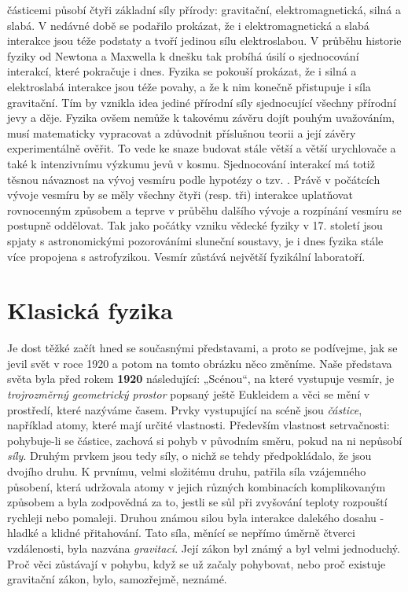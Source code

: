     částicemi působí čtyři základní síly přírody: gravitační, elektromagnetická, silná a slabá. V
    nedávné době se podařilo prokázat, že i elektromagnetická a slabá interakce jsou téže podstaty a
    tvoří jedinou sílu elektroslabou. V průběhu historie fyziky od Newtona a Maxwella k dnešku tak
    probíhá úsilí o sjednocování interakcí, které pokračuje i dnes. Fyzika se pokouší prokázat, že i
    silná a elektroslabá interakce jsou téže povahy, a že k nim konečně přistupuje i síla
    gravitační. Tím by vznikla idea jediné přírodní síly sjednocující všechny přírodní jevy a děje.
    Fyzika ovšem nemůže k takovému závěru dojít pouhým uvažováním, musí matematicky vypracovat a
    zdůvodnit příslušnou teorii a její závěry experimentálně ověřit. To vede ke snaze budovat stále
    větší a větší urychlovače a také k intenzivnímu výzkumu jevů v kosmu. Sjednocování interakcí má
    totiž těsnou návaznost na vývoj vesmíru podle hypotézy o tzv. . Právě v
    počátcích vývoje vesmíru by se měly všechny čtyři (resp. tři) interakce uplatňovat rovnocenným
    způsobem a teprve v průběhu dalšího vývoje a rozpínání vesmíru se postupně oddělovat. Tak jako
    počátky vzniku vědecké fyziky v 17. století jsou spjaty s astronomickými pozorováními sluneční
    soustavy, je i dnes fyzika stále více propojena s astrofyzikou. Vesmír zůstává největší
    fyzikální laboratoří.

  \section{Klasická fyzika}\label{fyz:IchapIIsecIII}
    Je dost těžké začít hned se současnými představami, a proto se podívejme, jak se jevil svět v
    roce 1920 a potom na tomto obrázku něco změníme. Naše představa světa byla před rokem
    \textbf{1920} následující: „Scénou“, na které vystupuje vesmír, je \emph{trojrozměrný
    geometrický prostor} popsaný ještě Eukleidem a věci se mění v prostředí, které nazýváme časem.
    Prvky vystupující na scéně jsou \emph{částice}, například atomy, které mají určité vlastnosti.
    Především vlastnost setrvačnosti: pohybuje-li se částice, zachová si pohyb v původním směru,
    pokud na ni nepůsobí \emph{síly}. Druhým prvkem jsou tedy síly, o nichž se tehdy  
    předpokládalo, že jsou dvojího druhu. K prvnímu, velmi složitému druhu, patřila síla vzájemného
    působení, která udržovala atomy v jejich různých kombinacích komplikovaným způsobem a byla
    zodpovědná za to, jestli se sůl při zvyšování teploty rozpouští rychleji nebo pomaleji. Druhou
    známou silou byla interakce dalekého dosahu - hladké a klidné přitahování. Tato síla, měnící se
    nepřímo úměrně čtverci vzdálenosti, byla nazvána \emph{gravitací}. Její zákon byl známý a byl
    velmi jednoduchý. Proč věci zůstávají v pohybu, když se už začaly pohybovat, nebo proč existuje
    gravitační zákon, bylo, samozřejmě, neznámé.
    
